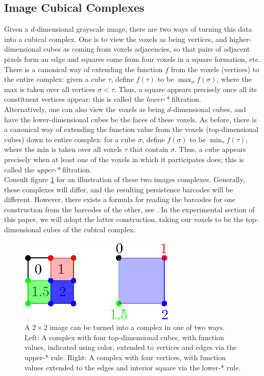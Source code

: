 \documentclass[conference]{IEEEtran}
\theoremstyle{definition}
\numberwithin{figure}{section}
\begin{document}
\subsection{Image Cubical Complexes}
Given a $d$-dimensional grayscale image, there are two ways of turning this data into a cubical complex. One is to view the voxels as being vertices, and higher-dimensional cubes as coming from voxels adjacencies, so that pairs of adjacent pixels form an edge and squares come from four voxels in a square formation, etc. There is a canonical way of extending the function $f$ from the voxels (vertices) to the entire complex: given a cube $\tau$, define $f(\tau)$ to be $\max_{\sigma} f(\sigma)$, where the max is taken over all vertices $\sigma < \tau$. Thus, a square appears precisely once all its constituent vertices appear; this is called the \emph{lower-*} filtration.\\

Alternatively, one can also view the voxels as being $d$-dimensional cubes, and have the lower-dimensional cubes be the faces of these voxels. As before, there is a canonical way of extending the function value from the voxels (top-dimensional cubes) down to entire complex: for a cube $\sigma$, define $f(\sigma)$ to be $\min_{\tau} f(\tau)$, where the min is taken over all voxels $\tau$ that contain $\sigma$. Thus, a cube appears precisely when at least one of the voxels in which it participates does;  this is called the \emph{upper-*} filtration.\\ 

Consult figure \ref{fig:image_to_complex} for an illustration of these two images complexes. Generally, these complexes will differ, and the resulting persistence barcodes will be different. However, there exists a formula for reading the barcodes for one construction from the barcodes of the other, see \cite{bleile2021persistent}.
In the experimental section of this paper, we will adopt the latter construction, taking our voxels to be the top-dimensional cubes of the cubical complex.


\begin{figure}
	\centering
	\includegraphics[scale=2]{image_to_complex.eps}
	\caption{A $2 \times 2$ image can be turned into a complex in one of two ways. Left: A complex with four top-dimensional cubes, with function values, indicated using color, extended to vertices and edges via the upper-* rule. Right: A complex with four vertices, with function values extended to the edges and interior square via the lower-* rule.}
	\label{fig:image_to_complex}
\end{figure}
\end{document}
